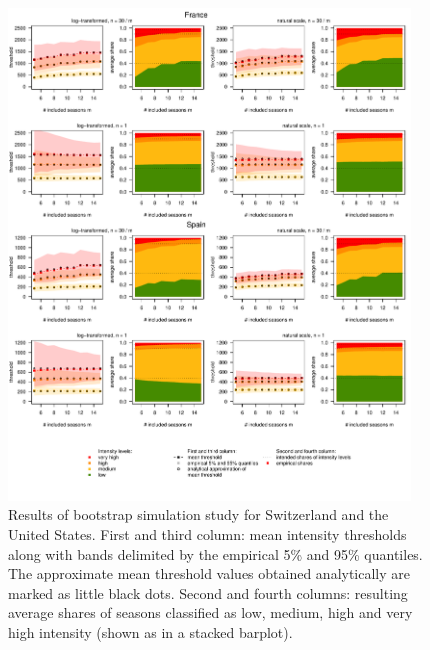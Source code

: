 \documentclass{article}
\begin{document}
\begin{figure}
\centering
\includegraphics[page=2, width=0.95\textwidth]{figure/plot_results.pdf}
\caption{Results of bootstrap simulation study for Switzerland and the United States. First and third column: mean intensity thresholds along with bands delimited by the empirical 5\% and 95\% quantiles. The approximate mean threshold values obtained analytically are marked as little black dots. Second and fourth columns: resulting average shares of seasons classified as low, medium, high and very high intensity (shown as in a stacked barplot).}
\label{fig:results2}
\end{figure}
\end{document}
